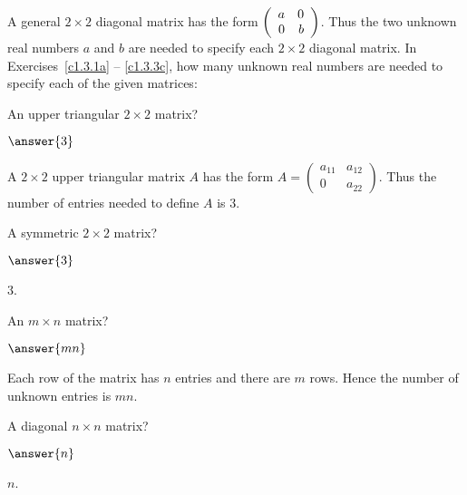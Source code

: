 \documentclass{ximera}
\begin{document}
\noindent A general $2\times 2$ diagonal matrix has the form
$\left(\begin{array}{rr} a & 0\\ 0 &b\end{array}\right)$.  Thus the two unknown real numbers $a$ and $b$ are
needed to specify each $2\times 2$ diagonal matrix.  In
Exercises~\ref{c1.3.1a} -- \ref{c1.3.3c}, how many unknown real numbers
are needed to specify each of the given matrices:
\begin{exercise}  \label{c1.3.1a}
An upper triangular $2\times 2$ matrix? \begin{prompt}$\answer{3}$\end{prompt}

\begin{solution}
A $2\times 2$ upper triangular matrix $A$ has the form $A = \left( \begin{array}{cc}
            a_{11} & a_{12} \\
            0 & a_{22} \end{array} \right)$.  Thus the number of entries needed to define $A$ is $3$.  

\end{solution}
\end{exercise}
\begin{exercise}  \label{c1.3.1b}
A symmetric $2\times 2$ matrix? \begin{prompt}$\answer{3}$\end{prompt}

\begin{solution}
$3$.

\end{solution}
\end{exercise}
\begin{exercise}  \label{c1.3.2}
An $m\times n$ matrix? \begin{prompt}$\answer{mn}$\end{prompt}

\begin{solution}
Each row of the matrix has $n$ entries and there are $m$ rows.  Hence the number of unknown entries is $mn$.

\end{solution}
\end{exercise}
\begin{exercise}  \label{c1.3.3a}
A diagonal $n\times n$ matrix? \begin{prompt}$\answer{n}$\end{prompt}

\begin{solution}
$n$.

\end{solution}
\end{exercise}
\end{document}

